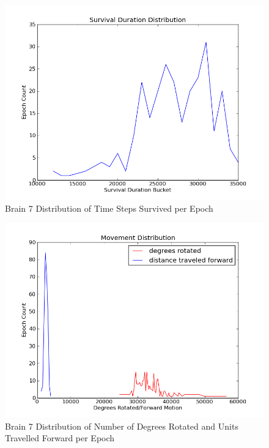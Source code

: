 \documentclass[a4paper,11pt]{article}
\begin{document}
\begin{figure}
\begin{center}
  \includegraphics[scale=1.0]{img/brain7/survivalGauss-6835.36.png}
  \caption{Brain 7 Distribution of Time Steps Survived per Epoch}
  \label{fig:b7survive}
\end{center}
\end{figure}

\begin{figure}
\begin{center}
  \includegraphics[scale=1.0]{img/brain7/travelGauss-r6482.71-d916.52.png}
  \caption{Brain 7 Distribution of Number of Degrees Rotated and Units Travelled Forward per Epoch}
  \label{fig:b7travel}
\end{center}
\end{figure}
\end{document}
